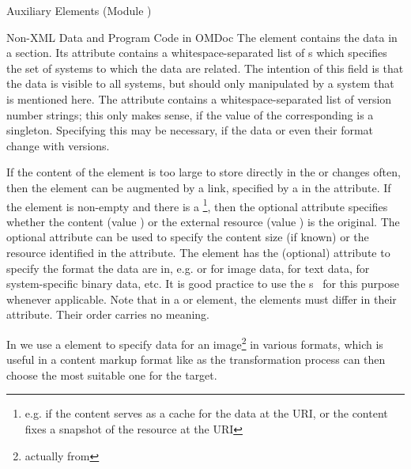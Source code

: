 \begin{tchapter}[id=ext,short=Auxiliary Elements]{Auxiliary Elements (Module {})}
\begin{tsection}[id=private]{Non-XML Data and Program Code in OMDoc}
The {} element contains the data in a {} section.  Its
{} attribute contains a whitespace-separated list of
{s} which specifies the set of systems to which the data are
related.  The intention of this field is that the data is visible to all systems, but
should only manipulated by a system that is mentioned here. The
{} attribute contains a whitespace-separated list of version
number strings; this only makes sense, if the value of the corresponding
{} is a singleton. Specifying this may be necessary, if the data or
even their format change with versions.

If the content of the {} element is too large to store directly in the
{\omdoc} or changes often, then the {} element can be augmented by a link,
specified by a {} in the {} attribute. If
the {} element is non-empty and there is a
{}\footnote{e.g. if the {} content serves as a cache
  for the data at the URI, or the {} content fixes a snapshot of the
  resource at the URI}, then the optional attribute {} specifies
whether the {} content (value {}) or the
external resource (value {}) is the original. The
optional {} attribute can be used to specify the content size (if
known) or the resource identified in the {} attribute. The
{} element has the (optional) attribute {} to
specify the format the data are in, e.g.  {} or
{} for image data, {} for
text data, {} for system-specific binary data, etc. It is
good practice to use the {s}~\cite{FreBor:MIME96} for this purpose
whenever applicable.  Note that in a {} or {} element, the
{} elements must differ in their {} attribute. Their
order carries no meaning.

In {} we use a {} element to specify data
for an image\footnote{actually {} from {}}
in various formats, which is useful in a content markup format like {\omdoc} as
the transformation process can then choose the most suitable one for the target.


\end{tsection}
\end{tchapter}
